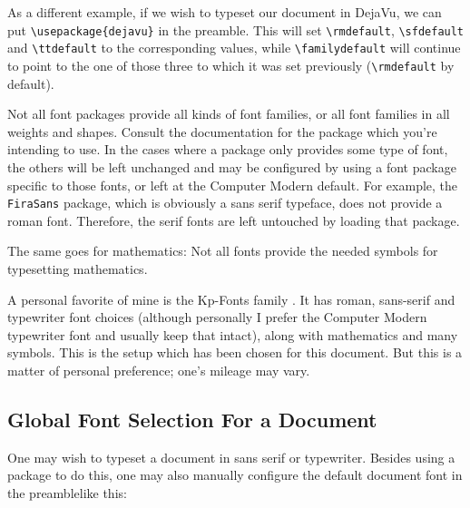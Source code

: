 \documentclass[a4paper,oneside,11pt]{article}
\newcommand\compar[2]{\texttt{\textbackslash #1\{#2\}}}
\newcommand\comm[1]{\texttt{\textbackslash#1}}
\newcommand\code[1]{\texttt{#1}}
\begin{document}
As  a  different example,  if  we  wish to  typeset  our  document in  DejaVu,
we  can  put  \compar{usepackage}{dejavu}{}  in the  preamble. This  will  set
\comm{rmdefault}, \comm{sfdefault}  and \comm{ttdefault} to  the corresponding
values, while \comm{familydefault} will continue to  point to the one of those
three to which it was set previously (\comm{rmdefault} by default).

Not all font packages provide all kinds of font families, or all font families
in all  weights and  shapes. Consult the documentation  for the  package which
you're intending to use. In the cases  where a package only provides some type
of font, the  others will be left  unchanged and may be configured  by using a
font  package  specific  to  those  fonts, or  left  at  the  Computer  Modern
default. For example, the  \code{FiraSans} package, which is  obviously a sans
serif typeface, does not provide a  roman font. Therefore, the serif fonts are
left untouched by loading that package.

The same  goes for mathematics: Not all  fonts provide the needed  symbols for
typesetting mathematics.

A personal  favorite of mine  is the Kp-Fonts family  \cite{ctan:kpfonts}.  It
has  roman, sans-serif  and  typewriter font  choices  (although personally  I
prefer  the Computer  Modern typewriter  font and  usually keep  that intact),
along with  mathematics and  many symbols. This  is the  setup which  has been
chosen for this  document. But this is a matter of  personal preference; one's
mileage may vary.


\subsection{Global Font Selection For a Document}
\label{subsec:fontsel:global}

One may wish to typeset a  document in sans serif or typewriter. Besides using
a package  to do this,  one may also  manually configure the  default document
font in the preamble\footnotemark like this:

\end{document}
